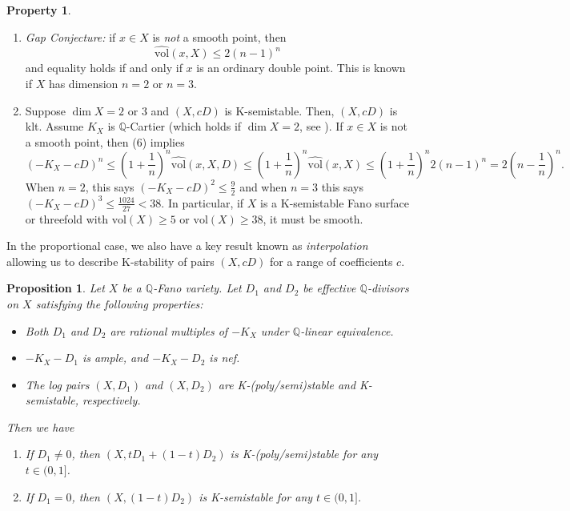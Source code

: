 \documentclass[11pt]{amsart}
\numberwithin{equation}{section}
\newtheorem{prop}[theorem]{Proposition}
\theoremstyle{definition}
\newtheorem{property}[theorem]{Property}
\newcommand{\bQ}{\mathbb{Q}}
\newcommand{\vol}{\mathrm{vol}}
\begin{document}
\begin{property}
\begin{enumerate}
    For example, if $(-K_X - cD)^n > \frac{(n+1)^n}{2}$, this implies $-K_X$ must be Cartier.  In particular, if $n = 2$ and $D = 0$, this says any K-semistable Fano surface with $(-K_X)^2 > \frac{9}{2}$ must be Gorenstein and hence have only canonical singularities. 
    \item \cite{LXcubics} \textit{Gap Conjecture:} if $x\in X$ is \textit{not} a smooth point, then 
    \[ \widehat{\vol}(x,X) \le 2(n-1)^n \] and equality holds if and only if $x$ is an ordinary double point. This is known if $X$ has dimension $n = 2 $ or $n = 3$.
    \item Suppose $\dim X = 2$ or $3$ and $(X,cD)$ is K-semistable.  Then, $(X,cD)$ is klt.  Assume $K_X$ is $\bQ$-Cartier (which holds if $\dim X = 2$, see \cite[Chapter 4]{KM98}).  If $x \in X$ is not a smooth point, then (6) implies
    \[ (-K_X-cD)^n \le \left( 1 + \frac{1}{n}\right)^n \widehat{\vol}(x,X,D) \le  \left( 1 + \frac{1}{n}\right)^n \widehat{\vol}(x,X) \le   \left( 1 + \frac{1}{n}\right)^n 2(n-1)^n = 2 \left(n - \frac{1}{n} \right)^n. \]
    When $n = 2$, this says $(-K_X - cD)^2 \le \frac{9}{2}$ and when $n = 3$ this says $(-K_X - cD)^3 \le \frac{1024}{27} < 38$.  In particular, if $X$ is a K-semistable Fano surface or threefold with $\vol(X) \ge 5$ or $\vol(X) \ge 38$, it must be smooth.
\end{enumerate}
\end{property}

In the proportional case, we also have a key result known as \textit{interpolation} allowing us to describe K-stability of pairs $(X,cD)$ for a range of coefficients $c$. 

\begin{prop}{\cite[Proposition 2.13]{ADLpub}}\label{prop:k-interpolation}
Let $X$ be a $\bQ$-Fano variety. Let $D_1$ and $D_2$ be effective $\bQ$-divisors on $X$ satisfying the following properties:
\begin{itemize}
    \item Both $D_1$ and $D_2$ are rational multiples of $-K_X$ under $\bQ$-linear equivalence.
    \item $-K_X-D_1$ is ample, and $-K_X-D_2$ is nef.
    \item The log pairs $(X,D_1)$ and $(X,D_2)$ are K-(poly/semi)stable and K-semistable, respectively.
\end{itemize}
Then we have
\begin{enumerate}
    \item If $D_1\neq 0$, then $(X,tD_1+(1-t)D_2)$ is K-(poly/semi)stable for any $t\in (0,1]$.
    \item If $D_1=0$, then $(X,(1-t)D_2)$ is K-semistable
    for any $t\in (0,1]$.
\end{enumerate}
\end{prop}
\end{document}

